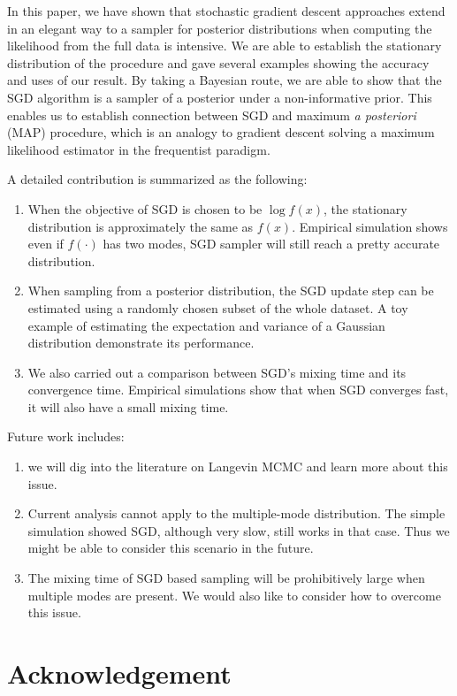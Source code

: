 \documentclass[preprint,12pt,3p]{elsarticle}
\begin{document}
In this paper, we have shown that stochastic gradient descent approaches extend in an elegant way to a sampler for posterior distributions when computing the likelihood from the full data is intensive. We are able to establish the stationary distribution of the procedure and gave several examples showing the accuracy and uses of our result. By taking a Bayesian route, we are able to show that the SGD algorithm is a sampler of a posterior under a non-informative prior. This enables us to establish connection between SGD and maximum \emph{a posteriori} (MAP) procedure, which is an analogy to gradient descent solving a maximum likelihood estimator in the frequentist paradigm.

A detailed contribution is summarized as the following:
\begin{enumerate}
    \item When the objective of SGD is chosen to be $\log f(x)$, the stationary distribution is approximately the same as $f(x)$. Empirical simulation shows even if $f(\cdot)$ has two modes, SGD sampler will still reach a pretty accurate distribution.
    \item When sampling from a posterior distribution, the SGD update step can be estimated using a randomly chosen subset of the whole dataset. A toy example of estimating the expectation and variance of a Gaussian distribution demonstrate its performance.
    \item We also carried out a comparison between SGD's mixing time and its convergence time. Empirical simulations show that when SGD converges fast, it will also have a small mixing time.
\end{enumerate}

Future work includes:
\begin{enumerate}
    \item we will dig into the literature on Langevin MCMC and learn more about this issue.
    \item Current analysis cannot apply to the multiple-mode distribution. The simple simulation showed SGD, although very slow, still works in that case. Thus we might be able to consider this scenario in the future.
    \item The mixing time of SGD based sampling will be prohibitively large when multiple modes are present. We would also like to consider how to overcome this issue.
\end{enumerate}

\section{Acknowledgement}
\end{document}

